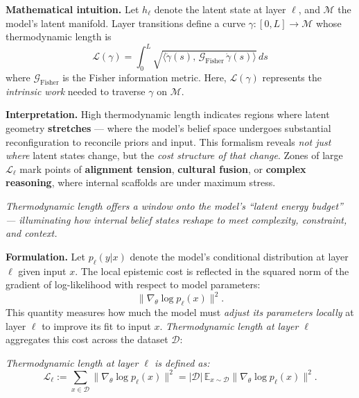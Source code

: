 \vspace{0.3em}

\noindent
\textbf{Mathematical intuition.}  
Let $h_\ell$ denote the latent state at layer $\ell$, and $\mathcal{M}$ the model’s latent manifold. 
Layer transitions define a curve 
$\gamma: [0,L] \to \mathcal{M}$ 
whose thermodynamic length is
\[
\boxed{
\mathcal{L}(\gamma) = \int_0^L \sqrt{ \big\langle \dot{\gamma}(s),\, \mathcal{G}_{\mathrm{Fisher}}\, \dot{\gamma}(s) \big\rangle }\, ds
}
\]
where $\mathcal{G}_{\mathrm{Fisher}}$ is the Fisher information metric. 
Here, $\mathcal{L}(\gamma)$ represents the \emph{intrinsic work} needed to traverse $\gamma$ on $\mathcal{M}$.

\vspace{0.3em}

\noindent
\textbf{Interpretation.}  
High thermodynamic length indicates regions where latent geometry \textbf{stretches} --- where the model’s belief space undergoes substantial reconfiguration to reconcile priors and input. 
This formalism reveals \emph{not just where} latent states change, but the \emph{cost structure of that change}. 
Zones of large $\mathcal{L}_\ell$ mark points of \textbf{alignment tension}, \textbf{cultural fusion}, or \textbf{complex reasoning}, where internal scaffolds are under maximum stress.

\vspace{0.3em}

\noindent
\emph{Thermodynamic length offers a window onto the model’s ``latent energy budget'' --- illuminating how internal belief states reshape to meet complexity, constraint, and context.}


\vspace{0.8em}

\noindent
\textbf{Formulation.}  
Let $p_\ell(y|x)$ denote the model’s conditional distribution at layer $\ell$ given input $x$. 
The local epistemic cost is reflected in the squared norm of the gradient of log-likelihood with respect to model parameters:
\[
\big\| \nabla_\theta \log p_\ell(x) \big\|^2.
\]
This quantity measures how much the model must \emph{adjust its parameters locally} at layer $\ell$ to improve its fit to input $x$. \emph{Thermodynamic length at layer $\ell$} aggregates this cost across the dataset $\mathcal{D}$:
\begin{tcolorbox}[
  colback=gray!5!white,
  colframe=black!75!white,
  boxrule=0.5pt,
  arc=2pt
]
\centering
\emph{Thermodynamic length at layer $\ell$ is defined as:}
\[
\mathcal{L}_\ell := \sum_{x \in \mathcal{D}} \big\| \nabla_\theta \log p_\ell(x) \big\|^2
= |\mathcal{D}| \, \mathbb{E}_{x \sim \mathcal{D}} \big\| \nabla_\theta \log p_\ell(x) \big\|^2.
\]
\end{tcolorbox}

